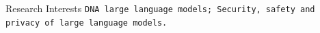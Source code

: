 \begin{rubric}{Research Interests}
  {\texttt{DNA large language models; Security, safety and privacy of large language models.}}\\[0.5em]
\end{rubric}